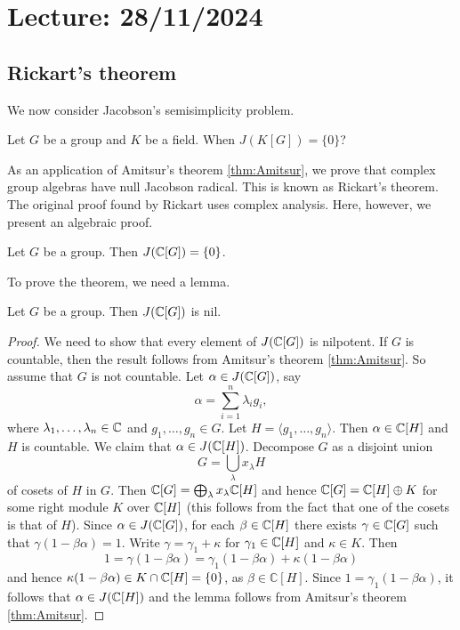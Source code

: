 \section{Lecture: 28/11/2024}

\subsection{Rickart's theorem}

We now consider Jacobson's semisimplicity problem. 

\begin{question}
\label{Jacobson's semisimplicity problem}
Let $G$ be a group and $K$ be a field. When $J(K[G])=\{0\}$?
\end{question}

As an application of Amitsur's theorem \ref{thm:Amitsur}, 
we prove that 
complex group algebras have null Jacobson radical.
This is known as 
Rickart's theorem. The original proof found by Rickart 
uses complex analysis. Here, however, 
we present an algebraic proof. 

\begin{theorem}[Rickart]
\label{thm:Rickart}
    Let $G$ be a group. Then $J(\mathbb{C}[G])=\{0\}$.
\end{theorem}

To prove the theorem, we need a lemma.

\begin{lemma}
Let $G$ be a group. Then $J(\mathbb{C}[G])$ is nil.        
\end{lemma}

\begin{proof}
    We need to show that every element of $J(\mathbb{C}[G])$ is nilpotent. 
    If $G$ is countable, then the result follows from Amitsur's theorem \ref{thm:Amitsur}. So assume that 
    $G$ is not countable. Let $\alpha\in J(\mathbb{C}[G])$, say
    \[
    \alpha=\sum_{i=1}^n\lambda_ig_i,
    \]
    where $\lambda_1,\dots,\lambda_n\in\mathbb{C}$ and $g_1,\dots,g_n\in G$. Let $H=\langle g_1,\dots,g_n\rangle$.
    Then $\alpha\in \mathbb{C}[H]$ and $H$ is countable. We claim that $\alpha\in J(\mathbb{C}[H])$. Decompose
    $G$ as a disjoint union 
    \[
    G=\bigcup_\lambda x_\lambda H
    \]
    of cosets of $H$ in $G$. Then $\mathbb{C}[G]=\bigoplus_\lambda x_\lambda\mathbb{C}[H]$ and
    hence $\mathbb{C}[G]=\mathbb{C}[H]\oplus K$ for some right module $K$ over $\mathbb{C}[H]$ (this follows
    from the fact that one of the cosets is that of $H$). Since $\alpha\in J(\mathbb{C}[G])$, for each 
    $\beta\in\mathbb{C}[H]$ there exists $\gamma\in\mathbb{C}[G]$ such that 
    $\gamma(1-\beta\alpha)=1$. Write $\gamma=\gamma_1+\kappa$ for $\gamma_1\in\mathbb{C}[H]$ and $\kappa\in K$. Then
    \[
    1=\gamma(1-\beta\alpha)=\gamma_1(1-\beta\alpha)+\kappa(1-\beta\alpha)
    \]
    and hence $\kappa(1-\beta\alpha)\in K\cap \mathbb{C}[H]=\{0\}$, as $\beta\in\mathbb{C}[H]$. 
    Since $1=\gamma_1(1-\beta\alpha)$, it follows that
    $\alpha\in J(\mathbb{C}[H])$ and the lemma follows from Amitsur's theorem \ref{thm:Amitsur}.  
\end{proof}

